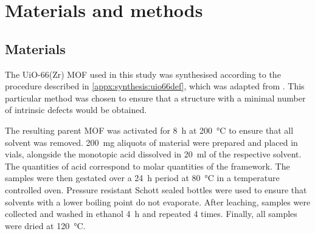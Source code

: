 
\section{Materials and methods}

\subsection{Materials}

The UiO-66(Zr) MOF used in this study was synthesised according
to the procedure described in \autoref{appx:synthesis:uio66def},
which was adapted from \citeauthor{shearerTunedPerfectionIroning2014}%
\cite{shearerTunedPerfectionIroning2014}.
This particular method was chosen to ensure that a structure with
a minimal number of intrinsic defects would be obtained.

The resulting parent MOF was activated for \SI{8}{\hour} at
\SI{200}{\degreeCelsius} to ensure that all solvent was removed.
\SI{200}{\milli\gram} aliquots of material were prepared and 
placed in vials, alongside the monotopic acid dissolved in
\SI{20}{\milli\litre} of the respective solvent. The quantities
of acid correspond to molar quantities of the framework.
The samples were then gestated over a \SI{24}{\hour} period
at \SI{80}{\degreeCelsius} in a temperature controlled oven.
Pressure resistant Schott sealed bottles were used to ensure that
solvents with a lower boiling point do not evaporate.
After leaching, samples were collected and washed in ethanol
\SI{4}{\hour} and repeated 4 times. Finally, all samples
were dried at \SI{120}{\degreeCelsius}.


